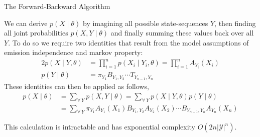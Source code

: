 \documentclass[envcountsect]{beamer}
\begin{document}
\begin{frame}{The Forward-Backward Algorithm}


We can derive $p(X \mid \theta)$ by imagining all possible state-sequences $Y$, then finding all joint probabilities $p(X, Y \mid \theta)$ and finally summing these values back over all $Y$.
To do so we require two identities that result from the model assumptions of emission independence and markov property:
\begin{alignat*}{2}
    p(X \mid Y, \theta) &= \prod_{i=1}^n p(X_i \mid Y_i, \theta) = \prod_{i=1}^n A_{Y_i}(X_i) \\
    p(Y \mid \theta) &= \pi_{Y_1} B_{Y_1,Y_2} \cdots T_{Y_{n-1},Y_n}
\end{alignat*}
These identities can then be applied as follows,
\begin{align*}
    p(X \mid \theta) &= \sum_{\forall \: Y} p(X,Y \mid \theta) = \sum_{\forall \: Y} p(X \mid Y, \theta) p(Y \mid \theta) \\
    &= \sum_{\forall \: Y} \pi_{Y_1} A_{Y_1}(X_1) B_{Y_1, Y_2} A_{Y_2}(X_2) \cdots B_{Y_{n-1}, Y_n} A_{Y_n}(X_n)
\end{align*}

This calculation is intractable and has exponential complexity $O(2n|\mathcal{Y}|^n)$.

\end{frame}
\end{document}
